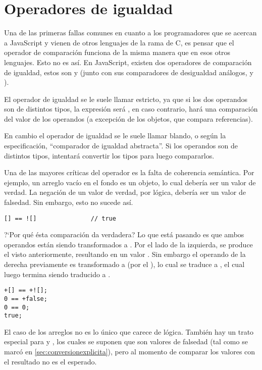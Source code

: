 \section{Operadores de igualdad}
\label{sec:eqeqeq}

Una de las primeras fallas comunes en cuanto a los programadores que se acercan a JavaScript y vienen de otros lenguajes de la rama de C, es pensar que el operador de comparación \code{==} funciona de la misma manera que en esos otros lenguajes. Esto no es así. En JavaScript, existen dos operadores de comparación de igualdad, estos son \code{==} y \code{===} (junto con sus comparadores de desigualdad análogos, \code{!=} y \code{!==}).

El operador de igualdad \code{===} se le suele llamar estricto, ya que si los dos operandos son de distintos tipos, la expresión será , en caso contrario, hará una comparación del valor de los operandos (a excepción de los objetos, que compara referencias).

En cambio el operador de igualdad \code{==} se le suele llamar blando, o según la especificación, "`comparador de igualdad abstracta"'. Si los operandos son de distintos tipos, intentará convertir los tipos para luego compararlos.

Una de las mayores críticas del operador \code{==} es la falta de coherencia semántica. Por ejemplo, un arreglo vacío \code{[]} en el fondo es un objeto, lo cual debería ser un valor de verdad. La negación de un valor de verdad, por lógica, debería ser un valor de falsedad. Sin embargo, esto no sucede así.

\begin{lstlisting}[title={Comparando un \code{Array} con su negación}]
[] == ![] 				// true
\end{lstlisting}

?`Por qué ésta comparación da verdadera? Lo que está pasando es que ambos operandos están siendo transformados a . Por el lado de la izquierda, se produce el  visto anteriormente, resultando en un valor . Sin embargo el operando de la derecha previamente es transformado a  (por el ), lo cual se traduce a , el cual luego termina siendo traducido a .

\begin{lstlisting}
+[] == +![];
0 == +false;
0 == 0;
true;
\end{lstlisting}

El caso de los arreglos no es lo único que carece de lógica. También hay un trato especial para  y , los cuales se suponen que son valores de falsedad (tal como se marcó en \ref{sec:conversionexplicita}), pero al momento de comparar los valores con  el resultado no es el esperado.

